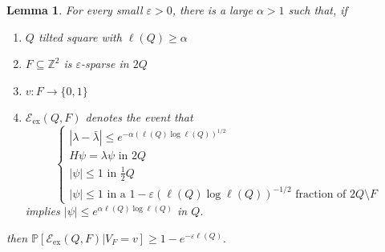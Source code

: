 \documentclass{amsart}
\newtheorem{lemma}[equation]{Lemma}
\numberwithin{equation}{section}
\numberwithin{figure}{section}
\newcommand{\Z}{\mathbb{Z}}
\renewcommand{\P}{\mathbb{P}}
\newcommand{\ep}{\varepsilon}
\begin{document}
\begin{lemma}
\label{l.excellent}
For every small $\ep > 0$, there is a large $\alpha > 1$ such that, if
\begin{enumerate}
\item $Q$ tilted square with $\ell(Q) \geq \alpha$
\item $F \subseteq \Z^2$ is $\ep$-sparse in $2Q$
\item $v : F \to \{ 0, 1 \}$
\item $\mathcal E_{\mathrm{ex}}(Q,F)$ denotes the event that
\begin{equation*}
\begin{cases}
|\lambda - \bar \lambda| \leq e^{-\alpha (\ell(Q) \log \ell(Q))^{1/2}} \\
H \psi = \lambda \psi \mbox{ in } 2Q \\
|\psi| \leq 1 \mbox{ in } \tfrac12 Q \\
|\psi| \leq 1 \mbox{ in a $1-\ep (\ell(Q) \log \ell(Q))^{-1/2}$ fraction of $2Q \setminus F$}
\end{cases}
\end{equation*}
implies $|\psi| \leq e^{\alpha \ell(Q) \log \ell(Q)}$ in $Q$.
\end{enumerate}
then $\P[\mathcal E_{\mathrm{ex}}(Q,F) | V_F = v] \geq 1 - e^{-\ep \ell(Q)}.$
\end{lemma}
\end{document}
